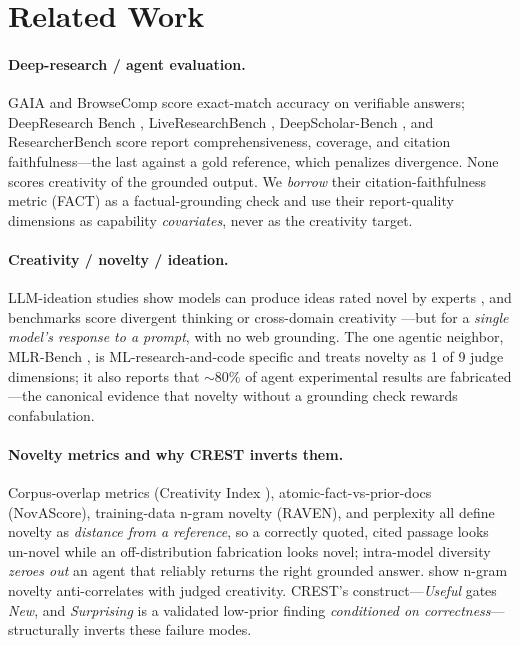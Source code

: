 \section{Related Work}
\label{sec:related}

\paragraph{Deep-research / agent evaluation.} GAIA \citep{mialon2023gaia} and BrowseComp \citep{wei2025browsecomp} score exact-match accuracy on verifiable answers; DeepResearch Bench \citep{du2025deepresearchbench}, LiveResearchBench \citep{liveresearchbench2025}, DeepScholar-Bench \citep{deepscholarbench2025}, and ResearcherBench \citep{researcherbench2025} score report comprehensiveness, coverage, and citation faithfulness---the last against a gold reference, which penalizes divergence. None scores creativity of the grounded output. We \emph{borrow} their citation-faithfulness metric (FACT) as a factual-grounding check and use their report-quality dimensions as capability \emph{covariates}, never as the creativity target.

\paragraph{Creativity / novelty / ideation.} LLM-ideation studies show models can produce ideas rated novel by experts \citep{si2024novel}, and benchmarks score divergent thinking \citep{ruan2024liveideabench} or cross-domain creativity \citep{houcreativityprism2025}---but for a \emph{single model's response to a prompt}, with no web grounding. The one agentic neighbor, MLR-Bench \citep{chen2025mlrbench}, is ML-research-and-code specific and treats novelty as 1 of 9 judge dimensions; it also reports that $\sim$80\% of agent experimental results are fabricated---the canonical evidence that novelty without a grounding check rewards confabulation.

\paragraph{Novelty metrics and why CREST inverts them.} Corpus-overlap metrics (Creativity Index \citep{lu2024creativityindex}), atomic-fact-vs-prior-docs (NovAScore), training-data n-gram novelty (RAVEN), and perplexity all define novelty as \emph{distance from a reference}, so a correctly quoted, cited passage looks un-novel while an off-distribution fabrication looks novel; intra-model diversity \citep{zhang2025noveltybench} \emph{zeroes out} an agent that reliably returns the right grounded answer. \citet{saakyan2026death} show n-gram novelty anti-correlates with judged creativity. CREST's construct---\emph{Useful} gates \emph{New}, and \emph{Surprising} is a validated low-prior finding \emph{conditioned on correctness}---structurally inverts these failure modes.

